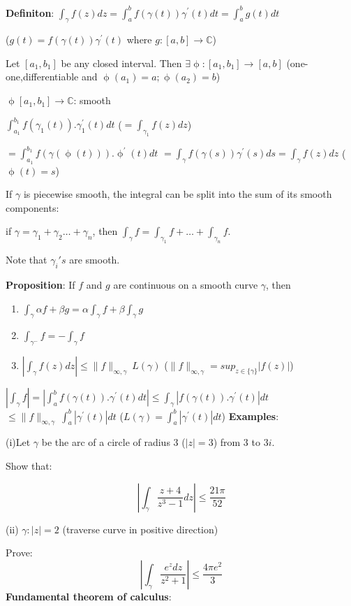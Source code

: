\documentclass{article}
\begin{document}
\begin{flushleft}
\textbf{Definiton}: $\int_{\gamma}^{} f(z) dz= \int_{a}^{b} f(\gamma(t)) \gamma^{'}(t) dt=\int_{a}^{b}g(t) dt$ 

($g(t)=f(\gamma(t)) \gamma^{'}(t)$ where $g:[a,b]\rightarrow \mathds{C}$)

Let $[a_1,b_1]$ be any closed interval. Then $\exists \upphi:[a_1,b_1]\rightarrow [a,b]$ (one-one,differentiable and $\upphi(a_1)=a;\upphi(a_2)=b$)

$\upphi[a_1,b_1] \rightarrow \mathds{C}$: smooth 

$\int_{a_1}^{b_1}f(\gamma_1(t)).\gamma_1^{'}(t)dt$ \: ($=\int_{\gamma_1}^{}f(z) dz$)

$=\int_{a_1}^{b_1}f(\gamma(\upphi(t))).\upphi^{'}(t) dt$
$=\int_{\gamma}^{} f(\gamma(s)) \gamma^{'}(s) ds=\int_{\gamma}^{}f(z) dz$ \: ($\upphi(t)=s$)

If $\gamma$ is piecewise smooth, the integral can be split into the sum of its smooth components:

if $\gamma=\gamma_1+\gamma_2 \dots +\gamma_n$, then $\int_{\gamma}^{} f = \int_{\gamma_1}^{} f + \dots + \int_{\gamma_n}^{} f$.

Note that $\gamma_i's$ are smooth.

\textbf{Proposition}: If $f$ and $g$ are continuous on a smooth curve $\gamma$, then 
\begin{enumerate}
    \item $\int_{\gamma}^{} \alpha f+\beta g = \alpha \int_{\gamma}^{} f + \beta\int_{\gamma}^{} g$
    \item $\int_{\gamma^{-}}^{} f = - \int_{\gamma}^{} f$
    \item $|\int_{\gamma}^{} f(z) dz| \leq \|f\|_{\infty,\gamma} \: L(\gamma)$ \: ($\|f\|_{\infty,\gamma}=sup_{z\in \{\gamma\}}|f(z)|$)
\end{enumerate}

$|\int_{\gamma}^{} f|= |\int_{a}^{b} f(\gamma(t)).\gamma^{'}(t) dt| \leq \int_{\gamma}^{} |f(\gamma(t)).\gamma^{'}(t)| dt$
$\leq \|f\|_{\infty,\gamma}\:  \int_{a}^{b} |\gamma^{'}(t)| dt$   \: ($L(\gamma)=\int_{a}^{b} |\gamma^{'}(t)| dt$)
\textbf{Examples}: 

(i)Let $\gamma$ be the arc of a circle of radius 3 ($|z|=3$) from $3$ to $3i$.

Show that:

$$|\int_{\gamma}^{} \frac{z+4}{z^3-1} dz| \leq \frac{21\pi}{52}$$

(ii) $\gamma: |z|=2$  (traverse curve in positive direction)

Prove: $$|\int_{\gamma}^{} \frac{e^z dz}{z^2+1} | \leq \frac{4\pi e^2}{3}$$
\clearpage
\textbf{Fundamental theorem of calculus}: 


\end{flushleft}
\end{document}
